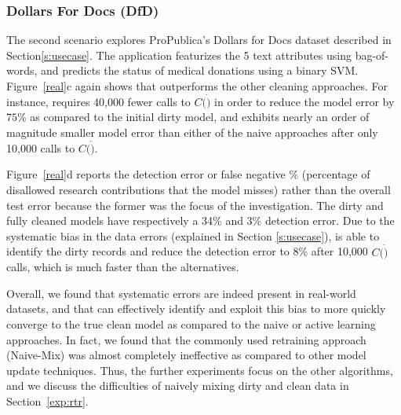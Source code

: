 \subsubsection{Dollars For Docs (DfD)}\label{exp:dfd}
The second scenario explores ProPublica's Dollars for Docs dataset described in Section\ref{s:usecase}.
The application featurizes the 5 text attributes using bag-of-words, and predicts the status of medical donations using a binary SVM.
Figure~\ref{real}c again shows that \sys outperforms the other cleaning approaches.
For instance, \sys requires 40,000 fewer calls to $C(\dot)$ in order to reduce the model error by $75\%$ as compared to the initial dirty model,
and exhibits nearly an order of magnitude smaller model error than either of the naive approaches after only 10,000 calls to $C(\dot)$.

Figure~\ref{real}d reports the detection error or false negative \% (percentage of disallowed research contributions that the model misses) rather than the overall test error because the former was the focus of the investigation.  The dirty and fully cleaned models have respectively a 34\% and 3\% detection error.
Due to the systematic bias in the data errors (explained in Section \ref{s:usecase}), \sys is able to identify the dirty records and
reduce the detection error to 8\% after 10,000 $C(\dot)$ calls, which is much faster than the alternatives.

Overall, we found that systematic errors are indeed present in real-world datasets, and that \sys can effectively identify and exploit this bias
to more quickly converge to the true clean model as compared to the naive or active learning approaches.  
In fact, we found that the commonly used retraining approach (Naive-Mix) was almost completely ineffective as compared to other model update techniques.
Thus, the further experiments focus on the other algorithms, and we discuss the difficulties of naively mixing dirty and clean data in Section~\ref{exp:rtr}.


